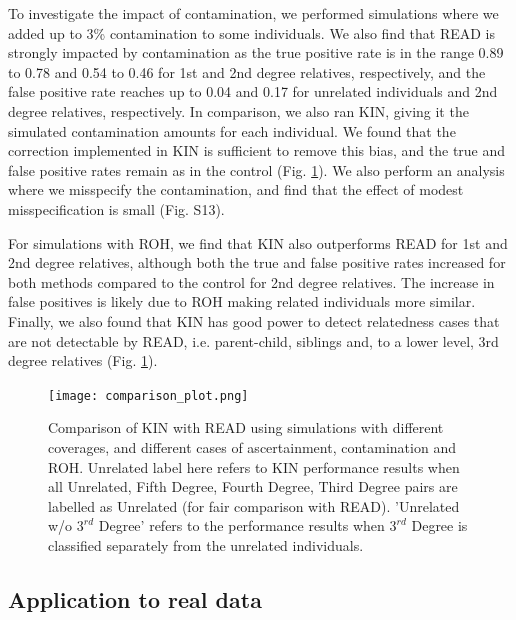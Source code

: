 \documentclass[12pt, letterpaper]{article}
\begin{document}
To investigate the impact of contamination, we performed simulations where we added up to 3\% contamination to some individuals. We also find that READ is strongly impacted by contamination  as the true positive rate is in the range 0.89 to 0.78 and 0.54 to 0.46 for 1st and 2nd degree relatives, respectively, and the false positive rate reaches up to 0.04 and 0.17 for unrelated individuals and 2nd degree relatives, respectively. In comparison, we also ran KIN, giving it the simulated contamination amounts for each individual. We found that the correction implemented in KIN is sufficient to remove this bias, and the true and false positive rates remain as in the control (Fig. \ref{fig3:Comparison_READ_KIN}). We also perform an analysis where we misspecify the contamination, and find that the effect of modest misspecification is small (Fig. S13).

For simulations with ROH, we find that KIN also outperforms READ for 1st and 2nd degree relatives, although both the true and false positive rates increased for both methods compared to the control for 2nd degree relatives. The increase in false positives is likely due to ROH making related individuals more similar. Finally, we also found that KIN has good power to detect relatedness cases that are not detectable by READ, i.e. parent-child, siblings and, to a lower level, 3rd degree relatives (Fig. \ref{fig3:Comparison_READ_KIN}).

\begin{figure}[ht!]
    \texttt{[image: comparison\_plot.png]}
    \centering
    \caption{Comparison of KIN with READ using simulations with different coverages, and different cases of ascertainment, contamination and ROH. Unrelated label here refers to KIN performance results when all Unrelated, Fifth Degree, Fourth Degree, Third Degree pairs are labelled as Unrelated (for fair comparison with READ). 'Unrelated w/o $3^{rd}$ Degree' refers to the performance results when $3^{rd}$ Degree is classified separately from the unrelated individuals.}
    \label{fig3:Comparison_READ_KIN}
\end{figure}

\subsection{Application to real data}
\end{document}
